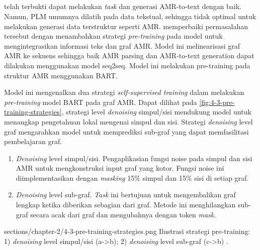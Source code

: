 \subsection{ }

 telah terbukti dapat melakukan \textit{task} \amrparsing{} dan generasi AMR-to-text dengan baik.
Namun, \gls{PLM} umumnya dilatih pada data tekstual, sehingga tidak optimal untuk melakukan generasi data terstruktur seperti \gls{AMR}.
\textcite{bai2022} memperbaiki permasalahan tersebut dengan menambahkan strategi \textit{pre-training} pada model untuk mengintegrasikan informasi teks dan graf \gls{AMR}.
Model ini melinearisasi graf \gls{AMR} ke sekuens sehingga baik AMR parsing dan AMR-to-text generation dapat dilakukan menggunakan model \gls{seq2seq}.
Model ini melakukan pre-training pada struktur \gls{AMR} menggunakan \gls{BART}.


Model ini mengenalkan dua strategi \textit{self-supervised training} dalam melakukan \textit{pre-training} model \gls{BART} pada graf \gls{AMR}.
Dapat dilihat pada \cref{fig:4-3-pre-training-strategies}, strategi level \textit{denoising} simpul/sisi mendukung model untuk menangkap pengetahuan lokal mengenai simpul dan sisi.
Strategi \textit{denoising} level graf mengarahkan model untuk memprediksi sub-graf yang dapat memfasilitasi pembelajaran graf.
\begin{enumerate}
  \item \textit{Denoising} level simpul/sisi.
  Pengaplikasian fungsi noise pada simpul dan sisi AMR untuk mengkonstruksi input graf yang kotor.
  Fungsi noise ini diimplementasikan dengan \textit{masking} 15\% simpul dan 15\% sisi di setiap graf.

  \item \textit{Denoising} level sub-graf.
  \textit{Task} ini bertujuan untuk mengembalikan graf lengkap ketika diberikan sebagian dari graf.
  Metode ini menghilangkan sub-graf secara acak dari graf dan mengubahnya dengan token \textit{mask}.
\end{enumerate}

  {sections/chapter-2/4-3-pre-training-strategies.png}
  {Ilustrasi strategi pre-training: 1) \textit{denoising} level simpul/sisi (a->b); 2) \textit{denoising} level sub-graf (c->b) .}
